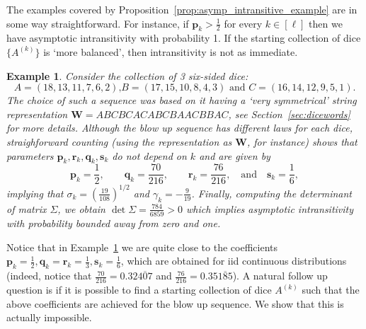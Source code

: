 \documentclass[reqno,a4paper,11pt]{amsart}
\newtheorem{proposition}[lemma]{Proposition}
\newtheorem{example}[lemma]{Example}
\theoremstyle{remark}
\newcommand{\mb}[1]{{\mathbf #1}}
\numberwithin{equation}{section}
\begin{document}
The examples covered by Proposition~\ref{prop:asymp_intransitive_example} are
in some way straightforward. For instance, if $\mb p_k > \frac{1}{2}$ for every $k \in
[\ell]$ then we have asymptotic intransitivity with probability 1. If the starting
collection of dice $\{A^{(k)}\}$ is `more balanced', then intransitivity is not
as immediate.

\begin{example}
\label{ex:blowup_close_intransitive}
Consider the collection of 3 six-sided dice:
\begin{equation*}
\text{$A = (18,13,11,7,6,2)$,
$B = (17,15,10,8,4,3)$ and $C = (16,14,12,9,5,1)$.}
\end{equation*}
The choice of such a sequence was based on it having a `very symmetrical'
string representation $\mb W = ABCBCACABCBAACBBAC$, see
Section~\ref{sec:dicewords} for more details. Although the blow up sequence
has different laws for each dice, straighforward counting (using the
representation as $\mb W$, for instance) shows that parameters $\mb p_k, \mb
r_k, \mb q_k, \mb s_k$ do not depend on $k$ and are given by
\begin{equation*}
\mb p_k = \frac{1}{2},
    \qquad \mb q_k = \frac{70}{216},
    \qquad \mb r_k = \frac{76}{216},
    \quad \text{and}
    \quad \mb s_k = \frac{1}{6},
\end{equation*}
implying that $\sigma_k = (\frac{19}{108})^{1/2}$ and
$\gamma_k = -\frac{9}{19}$. Finally, computing the determinant
of matrix $\Sigma$, we obtain $\det \Sigma = \frac{784}{6859} > 0$ which implies
asymptotic intransitivity with probability bounded away from zero and one. 
\end{example}

Notice that in Example~\ref{ex:blowup_close_intransitive} we are quite close to
the coefficients $\mb p_k = \frac{1}{2}, \mb q_k = \mb r_k = \frac{1}{3}, \mb
s_k = \frac{1}{6}$, which are obtained for iid continuous distributions
(indeed, notice that $\frac{70}{216} = 0.32\overline{407}$ and
$\frac{76}{216} = 0.35\overline{185}$).
A natural follow up question is if it is possible to find a starting collection
of dice $A^{(k)}$ such that the above coefficients are achieved for the blow up
sequence. We show that this is actually
impossible.

\end{document}
